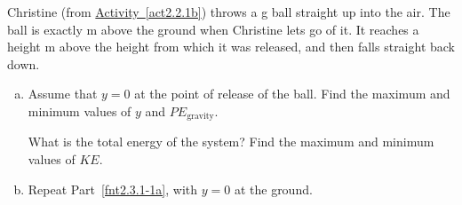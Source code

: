 \label{fnt2.3.1-1}

\noindent Christine (from \hyperref[act2.2.1b]{Activity~\ref*{act2.2.1b}}) throws a \unit[300]{g} ball straight up into the air. The ball is exactly \unit[2]{m} above the ground when Christine lets go of it. It reaches a height \unit[12]{m} above the height from which it was released, and then falls straight back down.

\begin{enumerate}[(a)]
	\item\label{fnt2.3.1-1a} Assume that $y = 0$ at the point of release of the ball. Find the maximum and minimum values of $y$ and $PE_\text{gravity}$.
	
		What is the total energy of the system? Find the maximum and minimum values of $KE$.

	\item\label{fnt2.3.1-1b} Repeat Part~\eqref{fnt2.3.1-1a}, with $y = 0$ at the ground.	
\end{enumerate}